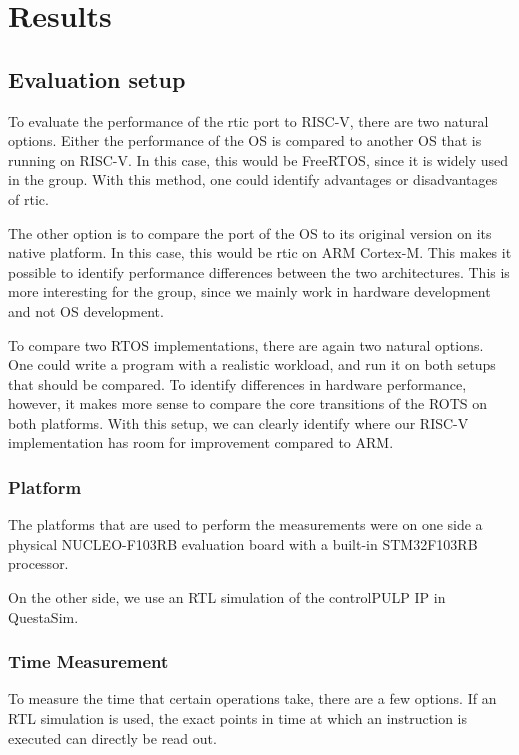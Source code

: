 \chapter{Results}
\label{ch:results}



\section{Evaluation setup}

\label{sec:comparison_targets}
To evaluate the performance of the \gls{rtic} port to RISC-V, there are two natural options. Either the performance of the OS is compared to another OS that is running on RISC-V. In this case, this would be FreeRTOS, since it is widely used in the group. With this method, one could identify advantages or disadvantages of \gls{rtic}.

The other option is to compare the port of the OS to its original version on its native platform. In this case, this would be \gls{rtic} on ARM Cortex-M. This makes it possible to identify performance differences between the two architectures. This is more interesting for the group, since we mainly work in hardware development and not OS development.

To compare two RTOS implementations, there are again two natural options. One could write a program with a realistic workload, and run it on both setups that should be compared. To identify differences in hardware performance, however, it makes more sense to compare the core transitions of the ROTS on both platforms. With this setup, we can clearly identify where our RISC-V implementation has room for improvement compared to ARM.

\subsection{Platform}
The platforms that are used to perform the measurements were on one side a physical NUCLEO-F103RB evaluation board with a built-in STM32F103RB processor.

On the other side, we use an RTL simulation of the controlPULP IP in QuestaSim. 

\subsection{Time Measurement}
\label{sec:time_measurement}
To measure the time that certain operations take, there are a few options. If an RTL simulation is used, the exact points in time at which an instruction is executed can directly be read out.

